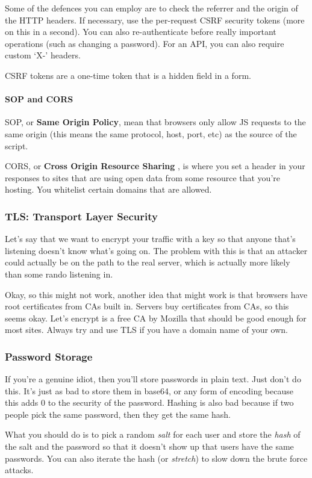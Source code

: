 \documentclass[11pt,a4paper,titlepage,dvipsnames,cmyk]{scrartcl}
\begin{document}
Some of the defences you can employ are to check the referrer and the
origin of the HTTP headers. If necessary, use the per-request CSRF
security tokens (more on this in a second). You can also re-authenticate
before really important operations (such as changing a password). For an
API, you can also require custom `X-' headers.

CSRF tokens are a one-time token that is a hidden field in a form.

\paragraph{SOP and CORS}%
\label{par:SOP and CORS}

SOP, or \textbf{Same Origin Policy}, mean that browsers only allow JS
requests to the same origin (this means the same protocol, host, port,
etc) as the source of the script.

CORS, or \textbf{Cross Origin Resource Sharing} , is where you set a
header in your responses to sites that are using open data from some
resource that you're hosting. You whitelist certain domains that are
allowed.

\subsubsection{TLS: Transport Layer Security}%
\label{ssub:TLS}

Let's say that we want to encrypt your traffic with a key so that anyone
that's listening doesn't know what's going on. The problem with this is
that an attacker could actually be on the path to the real server, which
is actually more likely than some rando listening in.

Okay, so this might not work, another idea that might work is that
browsers have root certificates from CAs built in. Servers buy
certificates from CAs, so this seems okay. Let's encrypt is a free CA by
Mozilla that should be good enough for most sites. Always try and use TLS
if you have a domain name of your own. 

\subsubsection{Password Storage}%
\label{ssub:Password Storage}
If you're a genuine idiot, then you'll store passwords in plain text. Just
don't do this. It's just as bad to store them in base64, or any form of
encoding because this adds 0 to the security of the password. Hashing is
also bad because if two people pick the same password, then they get the
same hash.

What you should do is to pick a random \textit{salt} for each user and
store the \textit{hash} of the salt and the password so that it doesn't
show up that users have the same passwords. You can also iterate the hash
(or \textit{stretch}) to slow down the brute force attacks.
\end{document}
